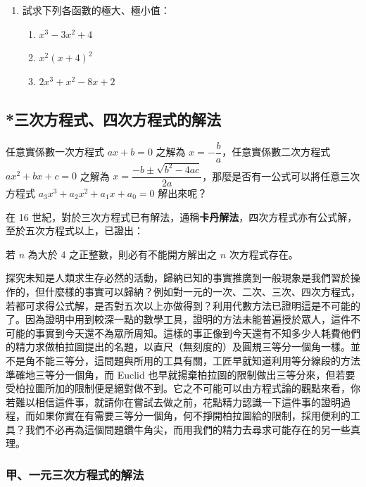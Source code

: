 \begin{enumerate}[label=\arabic*., leftmargin=2em]
  \item 試求下列各函數的極大、極小值：
  \begin{enumerate}[label=(\roman*)]
    \item $x^3-3x^2+4$
    \item $x^2(x+4)^2$
    \item $2x^3+x^2-8x+2$
  \end{enumerate}
\end{enumerate}

\subsection{*三次方程式、四次方程式的解法}\label{sec:b6-2-5}
\resetsectcounters

任意實係數一次方程式 $ax+b=0$ 之解為 $x=-\dfrac{b}{a}$，任意實係數二次方程式 $ax^2+bx+c=0$ 之解為 $x=\dfrac{-b \pm \sqrt{b^2-4ac}}{2a}$，那麼是否有一公式可以將任意三次方程式 $a_3 x^3 + a_2 x^2 + a_1 x + a_0 = 0$ 解出來呢？

在 16 世紀，對於三次方程式已有解法，通稱\textbf{卡丹解法}，四次方程式亦有公式解，至於五次方程式以上，已證出：

\begin{theorem}\label{thm:b6-2-abel-ruffini}
若 $n$ 為大於 4 之正整數，則必有不能開方解出之 $n$ 次方程式存在。
\end{theorem}

探究未知是人類求生存必然的活動，歸納已知的事實推廣到一般現象是我們習於操作的，但什麼樣的事實可以歸納？例如對一元的一次、二次、三次、四次方程式，若都可求得公式解，是否對五次以上亦做得到？利用代數方法已證明這是不可能的了。因為證明中用到較深一點的數學工具，證明的方法未能普遍授於眾人，這件不可能的事實到今天還不為眾所周知。這樣的事正像到今天還有不知多少人耗費他們的精力求做柏拉圖提出的名題，以直尺（無刻度的）及圓規三等分一個角一樣。並不是角不能三等分，這問題與所用的工具有關，工匠早就知道利用等分線段的方法準確地三等分一個角，而 Euclid 也早就揚棄柏拉圖的限制做出三等分來，但若要受柏拉圖所加的限制便是絕對做不到。它之不可能可以由方程式論的觀點來看，你若難以相信這件事，就請你在嘗試去做之前，花點精力認識一下這件事的證明過程，而如果你實在有需要三等分一個角，何不掙開柏拉圖給的限制，採用便利的工具？我們不必再為這個問題鑽牛角尖，而用我們的精力去尋求可能存在的另一些真理。

\subsubsection*{甲、一元三次方程式的解法}\label{subsec:b6-2-5-a}

